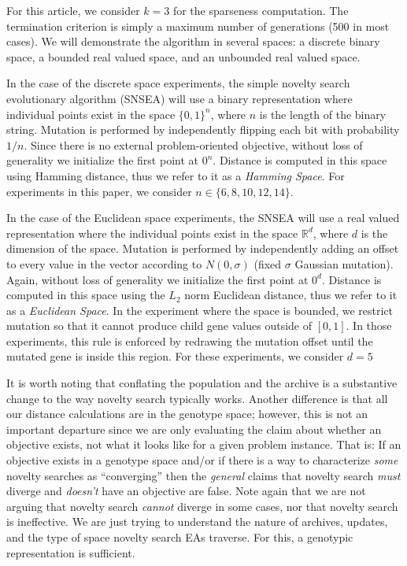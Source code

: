 \documentclass[twoside]{article}
\newcommand{\IR}{\mathbb{R}}
\begin{document}
For this article, we consider $k=3$ for the sparseness computation.  The termination criterion is simply a maximum number of generations (500 in most cases).  We will demonstrate the algorithm in several spaces: a discrete binary space, a bounded real valued space, and an unbounded real valued space.  

In the case of the discrete space experiments, the simple novelty search evolutionary algorithm (SNSEA) will use a binary representation where individual points exist in the space $\{0,1\}^n$, where $n$ is the length of the binary string.  Mutation is performed by independently flipping each bit with probability $1/n$.  Since there is no external problem-oriented objective, without loss of generality we initialize the first point at $0^n$.  Distance is computed in this space using Hamming distance, thus we refer to it as a \emph{Hamming Space}.  For experiments in this paper, we consider $n\in\{6,8,10,12,14\}$.

In the case of the Euclidean space experiments, the SNSEA will use a real valued representation where the individual points exist in the space $\IR^d$, where $d$ is the dimension of the space.  Mutation is performed by independently adding an offset to every value in the vector according to $N(0,\sigma)$ (fixed $\sigma$ Gaussian mutation).  Again, without loss of generality we initialize the first point at $0^d$.  Distance is computed in this space using the $L_2$ norm Euclidean distance, thus we refer to it as a \emph{Euclidean Space}.  In the experiment where the space is bounded, we restrict mutation so that it cannot produce child gene values outside of $[0,1]$.  In those experiments, this rule is enforced by redrawing the mutation offset until the mutated gene is inside this region.  For these experiments, we consider $d=5$

It is worth noting that conflating the population and the archive is a substantive change to the way novelty search typically works.  Another difference is that all our distance calculations are in the genotype space; however, this is not an important departure since we are only evaluating the claim about whether an objective exists, not what it looks like for a given problem instance.  That is:  If an objective exists in a genotype space and/or if there is a way to characterize \emph{some} novelty searches as ``converging'' then the \emph{general} claims that novelty search \emph{must} diverge and \emph{doesn't} have an objective are false.  Note again that we are not arguing that novelty search \emph{cannot} diverge in some cases, nor that novelty search is ineffective.  We are just trying to understand the nature of archives, updates, and the type of space novelty search EAs traverse.  For this, a genotypic representation is sufficient.
\end{document}
